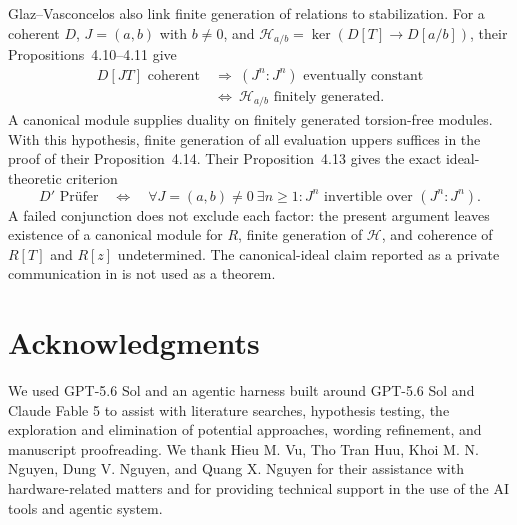 \documentclass[11pt,reqno]{amsart}
\numberwithin{equation}{section}
\theoremstyle{plain}
\begin{document}
Glaz--Vasconcelos also link finite generation of relations to
stabilization. For a coherent $D$, $J=(a,b)$ with $b\ne0$, and
$\mathcal H_{a/b}=\ker(D[T]\to D[a/b])$, their
Propositions~4.10--4.11 give \cite{GlazVasconcelos1984}
\begin{align*}
 D[JT]\text{ coherent}
 &\ \Longrightarrow\ (J^n:J^n)\text{ eventually constant}\\
 &\ \Longleftrightarrow\ \mathcal H_{a/b}\text{ finitely generated}.
\end{align*}
A canonical module supplies duality on finitely generated torsion-free
modules. With this hypothesis, finite generation of all evaluation
uppers suffices in the proof of their Proposition~4.14. Their
Proposition~4.13 gives the exact ideal-theoretic criterion
\[
 D'\text{ Pr\"ufer}\quad\Longleftrightarrow\quad
 \forall J=(a,b)\ne0\ \exists n\geq1:
 J^n\text{ invertible over }(J^n:J^n).
\]
A failed conjunction does not exclude each factor: the
present argument leaves existence of a canonical module for $R$,
finite generation of $\mathcal H$, and coherence of $R[T]$ and $R[z]$
undetermined. The canonical-ideal claim reported as a private
communication in \cite[p.~336]{PapickCoherentOverrings1979} is not used
as a theorem.


\renewcommand{\sectionname}{}
\section*{Acknowledgments}
We used GPT-5.6 Sol and an agentic harness built around GPT-5.6 Sol and Claude Fable 5 to assist with literature searches, hypothesis testing, the exploration and elimination of potential approaches, wording refinement, and manuscript proofreading. We thank Hieu M. Vu, Tho Tran Huu, Khoi M. N. Nguyen, Dung V. Nguyen, and Quang X. Nguyen for their assistance with hardware-related matters and for providing technical support in the use of the AI tools and agentic system. %



\end{document}
